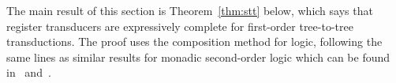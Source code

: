  


The main result of this section is Theorem~\ref{thm:stt} below, which says that register transducers are expressively complete for first-order tree-to-tree transductions. The proof uses the composition method for logic,  following the same lines as  similar results for monadic second-order logic which can be found in~\cite[Theorem 4.6]{alur2017streaming} and~\cite[Theorem 14]{bloem_comparison_2000}. 

